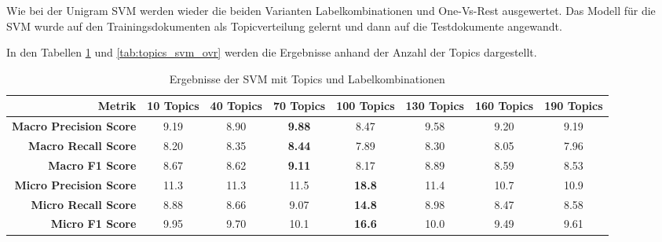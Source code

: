 Wie bei der Unigram SVM werden wieder die beiden Varianten Labelkombinationen und One-Vs-Rest ausgewertet.
Das Modell für die SVM wurde auf den Trainingsdokumenten als Topicverteilung gelernt und dann auf die Testdokumente angewandt.

In den Tabellen \ref{tab:topics_svm_labelcombs} und \ref{tab:topics_svm_ovr} werden die Ergebnisse anhand der Anzahl der Topics
dargestellt.

\begin{table}[h]
    \begin{tabular}{r|ccccccc}
        \tiny\textbf{Metrik} & \tiny\textbf{10 Topics} &\tiny \textbf{40 Topics} &\tiny \textbf{70 Topics} &\tiny \textbf{100 Topics} & \tiny \textbf{130 Topics} &  \tiny \textbf{160 Topics} &  \tiny \textbf{190 Topics} \\
        \hline
        \tiny \textbf{Macro Precision Score}  & \tiny 9.19 & \tiny 8.90& \tiny \textbf{9.88}&\tiny 8.47&\tiny 9.58&\tiny 9.20&\tiny 9.19\\
        \tiny \textbf{Macro Recall Score}     & \tiny 8.20 & \tiny 8.35& \tiny \textbf{8.44}&\tiny 7.89&\tiny 8.30&\tiny 8.05&\tiny 7.96\\
        \tiny \textbf{Macro F1 Score}        & \tiny 8.67 & \tiny 8.62& \tiny \textbf{9.11}&\tiny 8.17&\tiny 8.89&\tiny 8.59&\tiny 8.53\\
        \tiny \textbf{Micro Precision Score} & \tiny 11.3 & \tiny 11.3& \tiny 11.5&\tiny \textbf{18.8}&\tiny 11.4&\tiny 10.7&\tiny 10.9\\
        \tiny \textbf{Micro Recall Score}    & \tiny 8.88 & \tiny 8.66& \tiny 9.07&\tiny \textbf{14.8}&\tiny 8.98&\tiny 8.47&\tiny 8.58\\
        \tiny \textbf{Micro F1 Score}        & \tiny 9.95 & \tiny 9.70& \tiny 10.1&\tiny \textbf{16.6}&\tiny 10.0&\tiny 9.49&\tiny 9.61\\
    \end{tabular}
    \caption{Ergebnisse der SVM mit Topics und Labelkombinationen}
    \label{tab:topics_svm_labelcombs}
\end{table}

